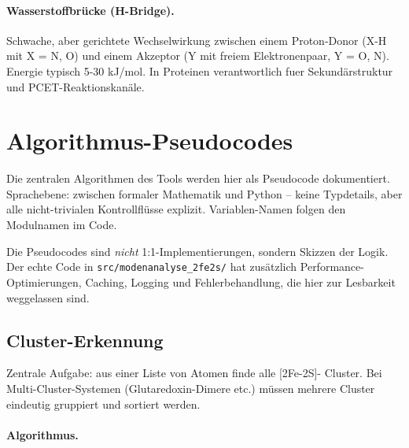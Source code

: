 \documentclass[11pt,a4paper,twoside]{article}
\theoremstyle{remark}
\begin{document}
\paragraph{Wasserstoffbr\"ucke (H-Bridge).}
Schwache, aber gerichtete Wechselwirkung zwischen einem
Proton-Donor (X-H mit X = N, O) und einem Akzeptor (Y mit
freiem Elektronenpaar, Y = O, N). Energie typisch 5-30
kJ/mol. In Proteinen verantwortlich fuer Sekund\"arstruktur und
PCET-Reaktionskan\"ale.

\section{Algorithmus-Pseudocodes}
\label{app:pseudocodes}

Die zentralen Algorithmen des Tools werden hier als Pseudocode
dokumentiert. Sprachebene: zwischen formaler Mathematik und Python --
keine Typdetails, aber alle nicht-trivialen Kontrollfl\"usse
explizit. Variablen-Namen folgen den Modulnamen im Code.

Die Pseudocodes sind \emph{nicht} 1:1-Implementierungen, sondern
Skizzen der Logik. Der echte Code in \texttt{src/modenanalyse\_2fe2s/}
hat zus\"atzlich Performance-Optimierungen, Caching, Logging und
Fehlerbehandlung, die hier zur Lesbarkeit weggelassen sind.

\subsection{Cluster-Erkennung}
\label{app:pseudo-cluster}

Zentrale Aufgabe: aus einer Liste von Atomen finde alle [2Fe-2S]-
Cluster. Bei Multi-Cluster-Systemen (Glutaredoxin-Dimere etc.) m\"ussen
mehrere Cluster eindeutig gruppiert und sortiert werden.

\paragraph{Algorithmus.}
\end{document}
